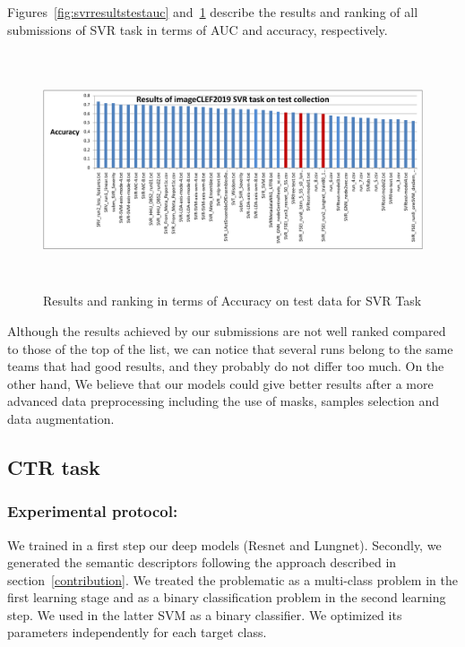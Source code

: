 \documentclass{llncs}
\begin{document}
Figures~\ref{fig:svrresultstestauc} and~\ref{fig:svrresultstestaccuracy} describe the results and ranking of all submissions of SVR task in terms of AUC and accuracy, respectively. 


\begin{figure}[!ht]
\includegraphics[width=12cm,height=7cm]{results_svr_test_accuracy.pdf}
\caption{Results and ranking in terms of Accuracy on test data for SVR Task} 
\label{fig:svrresultstestaccuracy}
\end{figure}

Although the results achieved by our submissions are not well ranked compared to those of the top of the list, we can notice that several runs belong to the same teams that had good results, and they probably do not differ too much. On the other hand, We believe that our models could give better results after a more advanced data preprocessing including the use of masks, samples selection and data augmentation.





\subsection{CTR task}
\subsubsection{Experimental protocol:}

We trained in a first step our deep models (Resnet and Lungnet). Secondly, we generated the semantic descriptors following the approach described in section~\ref{contribution}. We treated the problematic as a multi-class problem in the first learning stage and as a binary classification problem in the second learning step. We used in the latter SVM as a binary classifier. We optimized its parameters independently for each target class.\\
\end{document}
